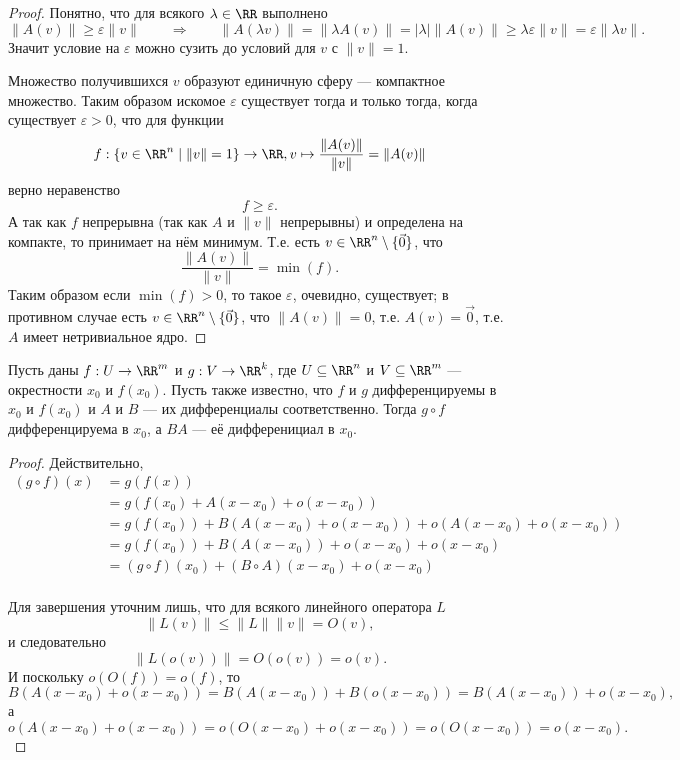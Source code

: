 \documentclass[12pt,a4paper]{article}
\begin{document}
    \begin{proof}
        Понятно, что для всякого $\lambda \in \RR$ выполнено
        \[\|A(v)\| \geqslant \varepsilon \|v\| \qquad \Longrightarrow \qquad \|A(\lambda v)\| = \|\lambda A(v)\| = |\lambda| \|A(v)\| \geqslant \lambda \varepsilon \|v\| = \varepsilon \|\lambda v\|.\]
        Значит условие на $\varepsilon$ можно сузить до условий для $v$ с $\|v\| = 1$.

        Множество получившихся $v$ образуют единичную сферу --- компактное множество. Таким образом искомое $\varepsilon$ существует тогда и только тогда, когда существует $\varepsilon > 0$, что для функции
        \[f: \{v \in \RR^n \mid \|v\| = 1\} \to \RR, v \mapsto \frac{\|A(v)\|}{\|v\|} = \|A(v)\|\]
        верно неравенство
        \[f \geqslant \varepsilon.\]
        А так как $f$ непрерывна (так как $A$ и $\|v\|$ непрерывны) и определена на компакте, то принимает на нём минимум. Т.е. есть $v \in \RR^n \setminus \{\vec{0}\}$, что
        \[\frac{\|A(v)\|}{\|v\|} = \min(f).\]
        Таким образом если $\min(f) > 0$, то такое $\varepsilon$, очевидно, существует; в противном случае есть $v \in \RR^n \setminus \{\vec{0}\}$, что $\|A(v)\| = 0$, т.е. $A(v) = \vec{0}$, т.е. $A$ имеет нетривиальное ядро.
    \end{proof}

    \begin{lemma}\label{composition-differential-lemma}
        Пусть даны $f: U \to \RR^m$ и $g: V \to \RR^k$, где $U \subseteq \RR^n$ и $V \subseteq \RR^m$ --- окрестности $x_0$ и $f(x_0)$. Пусть также известно, что $f$ и $g$ дифференцируемы в $x_0$ и $f(x_0)$ и $A$ и $B$ --- их дифференциалы соответственно. Тогда $g \circ f$ дифференцируема в $x_0$, а $BA$ --- её дифференициал в $x_0$.
    \end{lemma}

    \begin{proof}
        Действительно,
        \begin{align*}
            (g \circ f)(x)
            &= g(f(x))\\
            &= g(f(x_0) + A(x-x_0) + o(x-x_0))\\
            &= g(f(x_0)) + B(A(x-x_0) + o(x-x_0)) + o(A(x-x_0) + o(x-x_0))\\
            &= g(f(x_0)) + B(A(x-x_0)) + o(x-x_0) + o(x-x_0)\\
            &= (g \circ f)(x_0) + (B \circ A)(x-x_0) + o(x-x_0)\\
        \end{align*}

        Для завершения уточним лишь, что для всякого линейного оператора $L$
        \[\|L(v)\| \leqslant \|L\| \|v\| = O(v),\]
        и следовательно
        \[\|L(o(v))\| = O(o(v)) = o(v).\]
        И поскольку $o(O(f)) = o(f)$, то
        \[B(A(x-x_0) + o(x-x_0)) = B(A(x-x_0)) + B(o(x-x_0)) = B(A(x-x_0)) + o(x-x_0),\]
        а
        \[o(A(x-x_0) + o(x-x_0)) = o(O(x-x_0) + o(x-x_0)) = o(O(x-x_0)) = o(x-x_0).\]
    \end{proof}
\end{document}
